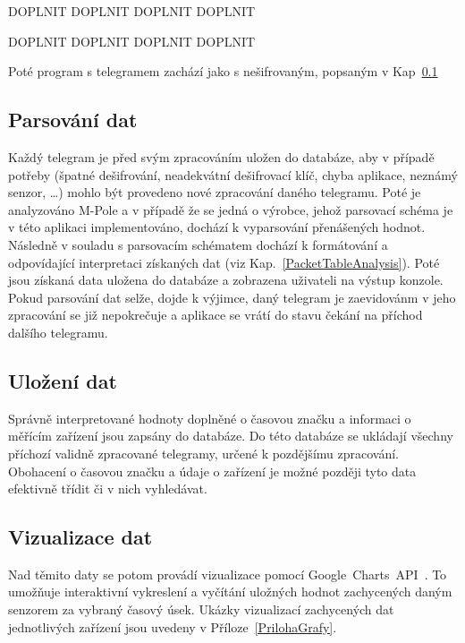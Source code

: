 \colorbox[rgb]{1,0,0}{DOPLNIT DOPLNIT DOPLNIT DOPLNIT}


\colorbox[rgb]{1,0,0}{DOPLNIT DOPLNIT DOPLNIT DOPLNIT}


Poté program s telegramem zachází jako s nešifrovaným, popsaným v Kap~\ref{KapitolaParsovani}

\subsection{Parsování dat}
\label{KapitolaParsovani}
Každý telegram je před svým zpracováním uložen do databáze, aby v případě potřeby (špatné dešifrování, neadekvátní dešifrovací klíč, chyba aplikace, neznámý senzor, \ldots) mohlo být provedeno nové zpracování daného telegramu. Poté je analyzováno M-Pole a v případě že se jedná o výrobce, jehož parsovací schéma je v této aplikaci implementováno, dochází k vyparsování přenášených hodnot. Následně v souladu s parsovacím schématem dochází k formátování a odpovídající interpretaci získaných dat (viz Kap.~\ref{PacketTableAnalysis}). Poté jsou získaná data uložena do databáze a zobrazena uživateli na výstup konzole.
Pokud parsování dat selže, dojde k výjimce, daný telegram je zaevidovánm v jeho zpracování se již nepokrečuje a aplikace se vrátí do stavu čekání na příchod dalšího telegramu.

\subsection{Uložení dat}
Správně interpretované hodnoty doplněné o časovou značku a informaci o měřícím zařízení jsou zapsány do databáze. Do této databáze se ukládají všechny příchozí validně zpracované telegramy, určené k pozdějšímu zpracování. Obohacení o časovou značku a údaje o zařízení je možné později tyto data efektivně třídit či v nich vyhledávat.

\subsection{Vizualizace dat}
Nad těmito daty se potom provádí vizualizace pomocí Google~Charts~API~\cite{uvod_google_charts_api}. To umožňuje interaktivní vykreslení a vyčítání uložných hodnot zachycených daným senzorem za vybraný časový úsek. Ukázky vizualizací zachycených dat jednotlivých zařízení jsou uvedeny v Příloze~\ref{PrilohaGrafy}.

